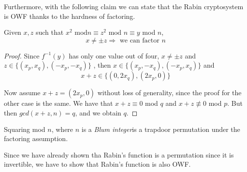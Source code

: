 Furthermore, with the following claim we can state that the Rabin cryptosystem
is OWF thanks to the hardness of factoring.

\begin{claim}
    Given $x, z$ such that $x^{2}\text{ mod} n \equiv z^{2} \text{ mod } n
    \equiv y$ mod $n$,
    \[
        x \neq \pm z \Rightarrow \text{ we can factor } n
    \]
\end{claim}

\begin{proof}
    Since $f^{-1}(y)$ has only one value out of four, $x\neq \pm z$ and $z\in \{(x_{p},x_{q}),(-x_{p},-x_{q})\}$ , then $x \in \{(x_{p},-x_{q}),(-x_{p},x_{q})\}$ and 
    \[
        x + z \in \{(0,2x_{q}), (2x_{p}, 0)\}
    \]

    Now assume $x + z = (2x_{p}, 0)$ without loss of generality, since the proof for the other case is the same. We have that $x+z \equiv 0$ mod $q$ and $x+z \not\equiv 0 $ mod $p$. But then $gcd( x+z , n)=q$, and we obtain $q$.
\end{proof}

\begin{theorem}
    Squaring mod $n$, where $n$ is a \emph{Blum integer}\footnotemark is a trapdoor permutation under the factoring assumption.
\end{theorem}


Since we have already shown tha Rabin's function is a permutation since it is invertible, we have to show that Rabin's function is also OWF.

